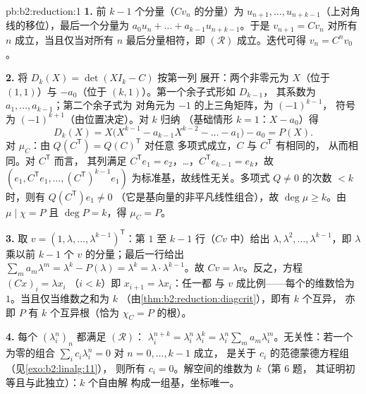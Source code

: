 \begin{solution}{pb:b2:reduction:1}
\textbf{1.} 前 $k - 1$ 个分量（$Cv_n$ 的分量）为 $u_{n+1},
\dots, u_{n+k-1}$（上对角线的移位），最后一个分量为
$a_0 u_n + \dots + a_{k-1}u_{n+k-1}$。于是 $v_{n+1} = Cv_n$ 对所有
$n$ 成立，当且仅当对所有 $n$ 最后分量相符，即
$(\mathcal R)$ 成立。迭代可得 $v_n = C^nv_0$。

\textbf{2.} 将 $D_k(X) = \det(XI_k - C)$ 按第一列
展开：两个非零元为 $X$（位于 $(1,1)$）与
$-a_0$（位于 $(k,1)$）。第一个余子式形如 $D_{k-1}$，
其系数为 $a_1, \dots, a_{k-1}$；第二个余子式为
对角元为 $-1$ 的上三角矩阵，为 $(-1)^{k-1}$，
符号为 $(-1)^{k+1}$（由位置决定）。对 $k$ 归纳
（基础情形 $k = 1$：$X - a_0$）得
\[
D_k(X) = X\bigl(X^{k-1} - a_{k-1}X^{k-2} - \dots - a_1\bigr) -
a_0 = P(X).
\]
对 $\mu_C$：由 $Q(C^{\mathsf T}) = Q(C)^{\mathsf T}$ 对任意
多项式成立，$C$ 与 $C^{\mathsf T}$ 有相同的，
从而相同。对 $C^{\mathsf T}$ 而言，
其列满足 $C^{\mathsf T}e_1 = e_2$，\dots，$C^{\mathsf
T}e_{k-1} = e_k$，故 $(e_1, C^{\mathsf T}e_1, \dots, (C^{\mathsf
T})^{k-1}e_1)$ 为标准基，故线性无关。多项式 $Q
\neq 0$ 的次数 $< k$ 时，则有 $Q(C^{\mathsf T})e_1 \neq 0$
（它是基向量的非平凡线性组合），故 $\deg\mu \geq
k$。由 $\mu \mid \chi = P$ 且 $\deg P = k$，得 $\mu_C = P$。

\textbf{3.} 取 $v = (1, \lambda, \dots, \lambda^{k-1})^{\mathsf
T}$：第 $1$ 至 $k-1$ 行（$Cv$ 中）给出 $\lambda, \lambda^2, \dots,
\lambda^{k-1}$，即 $\lambda$ 乘以前 $k - 1$ 个
$v$ 的分量；最后一行给出 $\sum_m a_m\lambda^m = \lambda^k -
P(\lambda) = \lambda^k = \lambda\cdot\lambda^{k-1}$。故 $Cv =
\lambda v$。反之，方程 $(Cx)_i = \lambda x_i$
（$i < k$）即 $x_{i+1} = \lambda x_i$：任一都
与 $v$ 成比例——每个的维数恰为
$1$。当且仅当维数之和为 $k$
（由\cref{thm:b2:reduction:diagcrit}），即有 $k$ 个互异，
亦即 $P$ 有 $k$ 个互异根（恰为
$\chi_C = P$ 的根）。

\textbf{4.} 每个 $(\lambda_i^n)_n$ 都满足 $(\mathcal R)$：
$\lambda_i^{n+k} = \lambda_i^n\,\lambda_i^k =
\lambda_i^n\sum_m a_m\lambda_i^m$。无关性：若一个
为零的组合 $\sum_i c_i\lambda_i^n = 0$ 对 $n = 0, \dots, k-1$ 成立，
是关于 $c_i$ 的范德蒙德方程组（见\cref{exo:b2:linalg:11}），
则所有 $c_i = 0$。解空间的维数为 $k$（第 6 题，
其证明初等且与此独立）：$k$ 个自由解
构成一组基，坐标唯一。


\end{solution}
